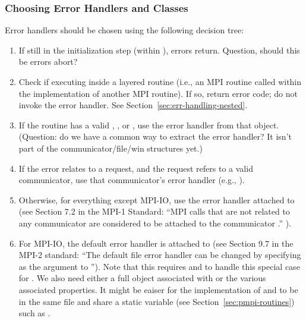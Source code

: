 \documentclass{article}
\begin{document}
\subsubsection{Choosing Error Handlers and Classes}
Error handlers should be chosen using the following decision tree:
\begin{enumerate}
\item If still in the initialization step (within
), errors return.  Question, should this be
errors abort?

\item Check if executing inside a layered routine (i.e., an MPI routine called
  within the implementation of another MPI routine).  If so, return error
  code; do not invoke the error handler.  See
  Section~\ref{sec:err-handling-nested}. 

\item If the routine has a valid , , or
  , use the error handler from that object.  (Question: do we
  have a common way to extract the error handler?  It isn't part of the
  communicator/file/win structures yet.)

\item If the error relates to a request, and the request refers to a valid
  communicator, use that communicator's error handler (e.g., ).

\item Otherwise, for everything except MPI-IO, use the error handler attached
  to   
  (see Section 7.2 in the MPI-1 Standard: ``MPI calls that are not related to
  any communicator are considered to be attached to the communicator
  .'' ).

\item For MPI-IO, the default error handler is attached to
   (see Section 9.7 in the MPI-2 standard: ``The default
  file error handler can be changed by specifying  as the
   argument to '').  Note that this
  requires  and
   to handle this special case for
  .  We also need either a full
 object associated with  or
the various associated properties.  It might be eaiser for the
implementation of  and
 to be in the same file and share a
static variable (see Section~\ref{sec:pmpi-routines}) such as
. 
\end{enumerate}
\end{document}
